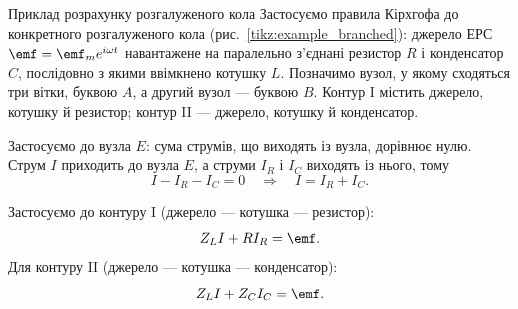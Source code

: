 \begin{Example}{Приклад розрахунку розгалуженого кола}
Застосуємо правила Кірхгофа до конкретного розгалуженого кола (рис.~\ref{tikz:example_branched}): джерело ЕРС $\emf = \emf_m e^{i\omega t}$ навантажене на паралельно з'єднані резистор $R$ і конденсатор $C$, послідовно з якими ввімкнено котушку $L$. Позначимо вузол, у якому сходяться три вітки, буквою $A$, а другий вузол --- буквою $B$. Контур I містить джерело, котушку й резистор; контур II --- джерело, котушку й конденсатор.

\begin{center}%
	\centering
	\label{tikz:example_branched}
\end{center}

Застосуємо  до вузла $E$: сума струмів, що виходять із вузла, дорівнює нулю. Струм $I$ приходить до вузла $E$, а струми $I_R$ і $I_C$ виходять із нього, тому
\begin{equation}\label{eq:example_KCL}
	I - I_R - I_C = 0
	\quad\Rightarrow\quad
	I = I_R + I_C.
\end{equation}

Застосуємо  до контуру I (джерело --- котушка --- резистор):
\begin{equation}\label{eq:example_KVL_I}
	Z_L I + R I_R = \emf.
\end{equation}
Для контуру II (джерело --- котушка --- конденсатор):
\begin{equation}\label{eq:example_KVL_II}
	Z_L I + Z_C I_C = \emf.
\end{equation}


\end{Example}
